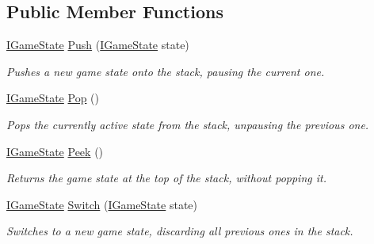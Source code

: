 \subsection*{Public Member Functions}
\begin{DoxyCompactItemize}
\item 
\hyperlink{interface_tri_devs_1_1_tri_engine2_d_1_1_state_management_1_1_i_game_state}{I\-Game\-State} \hyperlink{interface_tri_devs_1_1_tri_engine2_d_1_1_state_management_1_1_i_game_state_manager_add8436f8ea874ddad9b193ee22cd8533}{Push} (\hyperlink{interface_tri_devs_1_1_tri_engine2_d_1_1_state_management_1_1_i_game_state}{I\-Game\-State} state)
\begin{DoxyCompactList}\small\item\em Pushes a new game state onto the stack, pausing the current one. \end{DoxyCompactList}\item 
\hyperlink{interface_tri_devs_1_1_tri_engine2_d_1_1_state_management_1_1_i_game_state}{I\-Game\-State} \hyperlink{interface_tri_devs_1_1_tri_engine2_d_1_1_state_management_1_1_i_game_state_manager_ace3e065bf46bcf62d18ecb0d8bb0f2b3}{Pop} ()
\begin{DoxyCompactList}\small\item\em Pops the currently active state from the stack, unpausing the previous one. \end{DoxyCompactList}\item 
\hyperlink{interface_tri_devs_1_1_tri_engine2_d_1_1_state_management_1_1_i_game_state}{I\-Game\-State} \hyperlink{interface_tri_devs_1_1_tri_engine2_d_1_1_state_management_1_1_i_game_state_manager_a9913b01df18fea6e25c3d85759bc900e}{Peek} ()
\begin{DoxyCompactList}\small\item\em Returns the game state at the top of the stack, without popping it. \end{DoxyCompactList}\item 
\hyperlink{interface_tri_devs_1_1_tri_engine2_d_1_1_state_management_1_1_i_game_state}{I\-Game\-State} \hyperlink{interface_tri_devs_1_1_tri_engine2_d_1_1_state_management_1_1_i_game_state_manager_acbcf0ca71694d5f9120550532dd1cf42}{Switch} (\hyperlink{interface_tri_devs_1_1_tri_engine2_d_1_1_state_management_1_1_i_game_state}{I\-Game\-State} state)
\begin{DoxyCompactList}\small\item\em Switches to a new game state, discarding all previous ones in the stack. \end{DoxyCompactList}\end{DoxyCompactItemize}

